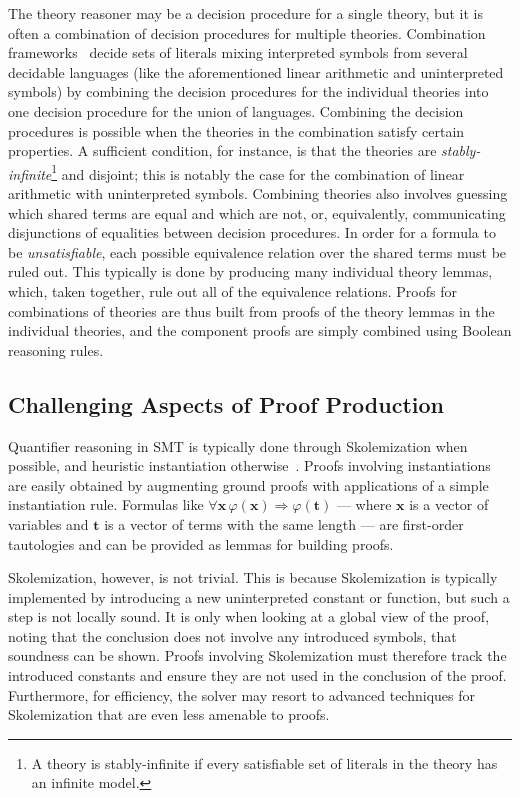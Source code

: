 \documentclass{llncs}
\begin{document}
The theory reasoner may be a decision procedure for a single theory, but it is often a
combination of decision procedures for multiple theories.  Combination
frameworks~\cite{Nelson3,Tinelli1} decide  sets of
literals mixing interpreted symbols from several decidable languages (like the
aforementioned linear arithmetic and uninterpreted symbols) by combining the
decision procedures for the individual theories into one decision
procedure for the union of languages.  Combining the decision procedures is possible
when the theories in the combination satisfy certain properties.  A sufficient
condition, for instance, is that the theories are \emph{stably-infinite}\footnote{A theory
  is stably-infinite if every satisfiable set of literals in the theory has an
  infinite model.} and disjoint; this is notably the case for the combination
of linear arithmetic with uninterpreted symbols.  Combining theories also
involves guessing which shared terms are equal and which are not, or,
equivalently, communicating disjunctions of equalities between decision
procedures.  In order for a formula to be \emph{unsatisfiable}, each
possible equivalence relation over the shared terms must be ruled out.  This
typically is done by producing many individual theory lemmas, which, taken
together, rule out all of the equivalence relations.  Proofs for combinations of
theories are thus built from proofs of the theory lemmas in the individual
theories, and the component proofs are simply combined using
Boolean reasoning rules.

\subsection{Challenging Aspects of Proof Production}

Quantifier reasoning in SMT is typically done through
Skolemization when possible, and heuristic instantiation
otherwise~\cite{Ge1,Moura9}.  Proofs involving instantiations are easily
obtained by augmenting ground proofs with applications of a simple
instantiation rule.  Formulas like $\forall \mathbf{x}\,
\varphi(\mathbf{x}) \Rightarrow \varphi(\mathbf{t})$ --- where $\mathbf{x}$ is a
vector of variables and $\mathbf{t}$ is a vector of terms with the same length
--- are first-order tautologies and can be provided as lemmas for building proofs.

Skolemization, however, is not trivial.  This is because Skolemization is
typically implemented by introducing a new uninterpreted constant or function,
but such a step %
is not locally sound.  It is only when looking at a global view
of the proof, noting that the conclusion does not involve any introduced
symbols, that soundness can be shown.  Proofs involving Skolemization must
therefore track the introduced constants and ensure they are not used
in the conclusion of the proof.  Furthermore, for efficiency, the solver may
resort to advanced techniques for Skolemization that are even less amenable to
proofs.
\end{document}
